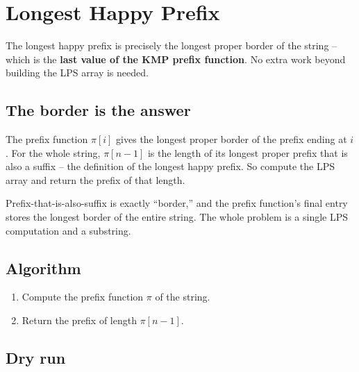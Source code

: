 \section{Longest Happy Prefix}
\label{sec:str-longest-happy-prefix}


\begin{patternbox}
The longest happy prefix is precisely the longest proper border of the
string -- which is the \textbf{last value of the KMP prefix function}. No
extra work beyond building the LPS array is needed.
\end{patternbox}

\subsection*{The border is the answer}

The prefix function $\pi[i]$ gives the longest proper border of the prefix
ending at $i$. For the whole string, $\pi[n-1]$ is the length of its longest
proper prefix that is also a suffix -- the definition of the longest happy
prefix. So compute the LPS array and return the prefix of that length.

\begin{ideabox}[{Longest Happy Prefix = Longest Border = $\pi[n-1]$}]
Prefix-that-is-also-suffix is exactly ``border,'' and the prefix function's
final entry stores the longest border of the entire string. The whole
problem is a single LPS computation and a substring.
\end{ideabox}

\subsection*{Algorithm}

\begin{enumerate}
  \item Compute the prefix function $\pi$ of the string.
  \item Return the prefix of length $\pi[n-1]$.
\end{enumerate}

\subsection*{Dry run}


